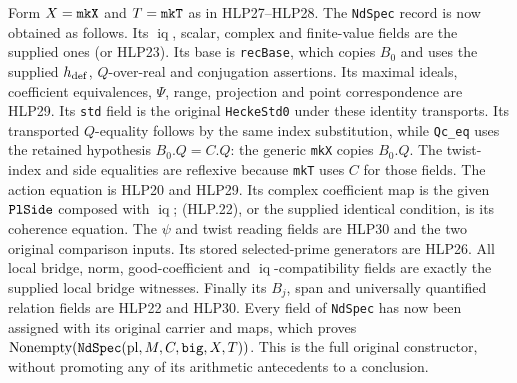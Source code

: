 Form \(X=\texttt{mk\allowbreak X}\) and \(T=\texttt{mk\allowbreak T}\) as in
HLP27--HLP28. The \texttt{Nd\allowbreak Spec} record is now obtained as
follows. Its \(\operatorname{iq}\), scalar, complex and finite-value
fields are the supplied ones (or HLP23). Its base is
\texttt{rec\allowbreak Base}, which copies \(B_0\) and uses the supplied
\(h_{\rm def}\), \(Q\)-over-real and conjugation assertions.
Its maximal ideals, coefficient equivalences, \(\Psi\), range,
projection and point correspondence are HLP29. Its \texttt{std}
field is the original \texttt{Hecke\allowbreak Std0} under these identity
transports. Its transported \(Q\)-equality follows by the same index
substitution, while \texttt{Qc\_\allowbreak eq} uses the retained hypothesis
\(B_0.Q=C.Q\): the generic \texttt{mk\allowbreak X} copies \(B_0.Q\).
The twist-index and side equalities are reflexive because
\texttt{mk\allowbreak T} uses \(C\) for those fields.
The action equation is HLP20 and HLP29. Its complex coefficient
map is the given \(\texttt{Pl\allowbreak Side}\) composed with
\(\operatorname{iq}\); (HLP.22), or the supplied identical
condition, is its coherence equation. The \(\psi\) and twist
reading fields are HLP30 and the two original comparison inputs.
Its stored selected-prime generators are HLP26. All local bridge,
norm, good-coefficient and \(\operatorname{iq}\)-compatibility
fields are exactly the supplied local bridge witnesses. Finally
its \(B_j\), span and universally quantified relation fields are
HLP22 and HLP30. Every field of \texttt{Nd\allowbreak Spec} has now been
assigned with its original carrier and maps, which proves
\(\operatorname{Nonempty}(\texttt{Nd\allowbreak Spec}(\mathrm{pl},M,C,
\texttt{big},X,T))\). This is the full original constructor,
without promoting any of its arithmetic antecedents to a
conclusion.

